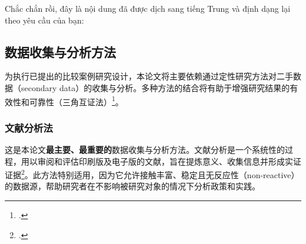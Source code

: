 
Chắc chắn rồi, đây là nội dung đã được dịch sang tiếng Trung và định dạng lại theo yêu cầu của bạn:

\subsection{数据收集与分析方法}
\label{subsec:phuong_phap_cu_the}

为执行已提出的比较案例研究设计，本论文将主要依赖通过定性研究方法对二手数据（secondary data）的收集与分析。多种方法的结合将有助于增强研究结果的有效性和可靠性（三角互证法）\footcite{DenzinLincoln2011}。

\subsubsection{文献分析法}
\label{subsubsec:phan_tich_tai_lieu}

这是本论文\textbf{最主要、最重要的}数据收集与分析方法。文献分析是一个系统性的过程，用以审阅和评估印刷版及电子版的文献，旨在提炼意义、收集信息并形成实证证据\footcite{Bowen2009}。此方法特别适用，因为它允许接触丰富、稳定且无反应性（non-reactive）的数据源，帮助研究者在不影响被研究对象的情况下分析政策和实践。

